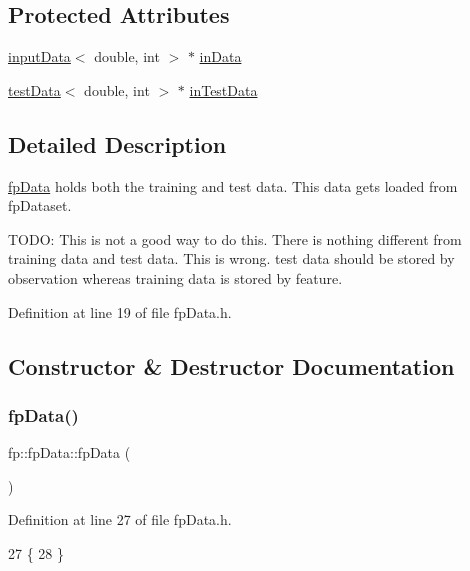 \subsection*{Protected Attributes}
\begin{DoxyCompactItemize}
\item 
\hyperlink{classfp_1_1inputData}{input\+Data}$<$ double, int $>$ $\ast$ \hyperlink{classfp_1_1fpData_a49d7c3f58bcf88843c25b1b0c9714ebe}{in\+Data}
\item 
\hyperlink{classfp_1_1testData}{test\+Data}$<$ double, int $>$ $\ast$ \hyperlink{classfp_1_1fpData_ad4f4dd3a8d15633b7f983932fa60bbad}{in\+Test\+Data}
\end{DoxyCompactItemize}


\subsection{Detailed Description}
\hyperlink{classfp_1_1fpData}{fp\+Data} holds both the training and test data. This data gets loaded from fp\+Dataset.

T\+O\+DO\+: This is not a good way to do this. There is nothing different from training data and test data. This is wrong. test data should be stored by observation whereas training data is stored by feature. 

Definition at line 19 of file fp\+Data.\+h.



\subsection{Constructor \& Destructor Documentation}
\mbox{\label{classfp_1_1fpData_a0e111a379a969d2ff0b3e8c5911cf78a}} 
\subsubsection{\texorpdfstring{fp\+Data()}{fpData()}}
{\footnotesize\ttfamily fp\+::fp\+Data\+::fp\+Data (\begin{DoxyParamCaption}{ }\end{DoxyParamCaption})\hspace{0.3cm}{\ttfamily [inline]}}



Definition at line 27 of file fp\+Data.\+h.


\begin{DoxyCode}
27                     \{
28             \}
\end{DoxyCode}
\mbox{\label{classfp_1_1fpData_a62998c12f30ea88e6b3ea30b17d1a3e0}} 
